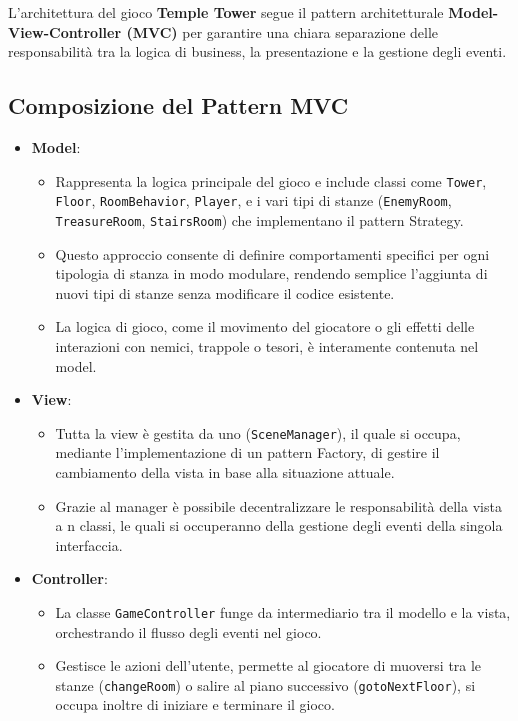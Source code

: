 \documentclass[a4paper,12pt]{report}
\begin{document}
L'architettura del gioco \textbf{Temple Tower} segue il pattern architetturale \textbf{Model-View-Controller (MVC)} per garantire una chiara separazione delle responsabilità tra la logica di business, la presentazione e la gestione degli eventi.

\subsection*{Composizione del Pattern MVC}
\begin{itemize}
    \item \textbf{Model}: 
    \begin{itemize}
        \item Rappresenta la logica principale del gioco e include classi come \texttt{Tower}, \texttt{Floor}, \texttt{RoomBehavior}, \texttt{Player}, e i vari tipi di stanze (\texttt{EnemyRoom}, \texttt{TreasureRoom}, \texttt{StairsRoom}) che implementano il pattern Strategy.
        \item Questo approccio consente di definire comportamenti specifici per ogni tipologia di stanza in modo modulare, rendendo semplice l'aggiunta di nuovi tipi di stanze senza modificare il codice esistente.
        \item La logica di gioco, come il movimento del giocatore o gli effetti delle interazioni con nemici, trappole o tesori, è interamente contenuta nel model.
    \end{itemize}

    \item \textbf{View}: 
    \begin{itemize}
        \item Tutta la view è gestita da uno (\texttt{SceneManager}), il quale si occupa, mediante l'implementazione di un pattern Factory, di gestire il
		cambiamento della vista in base alla situazione attuale.
        \item Grazie al manager è possibile decentralizzare le responsabilità della vista a n classi, le quali si occuperanno della gestione degli eventi
		della singola interfaccia.
    \end{itemize}

    \item \textbf{Controller}: 
    \begin{itemize}
        \item La classe \texttt{GameController} funge da intermediario tra il modello e la vista, orchestrando il flusso degli eventi nel gioco.
        \item Gestisce le azioni dell'utente, permette al giocatore di muoversi tra le stanze (\texttt{changeRoom}) o salire al piano successivo (\texttt{gotoNextFloor}), si occupa inoltre di iniziare e terminare il gioco.
    \end{itemize}
\end{itemize} 
\end{document}

